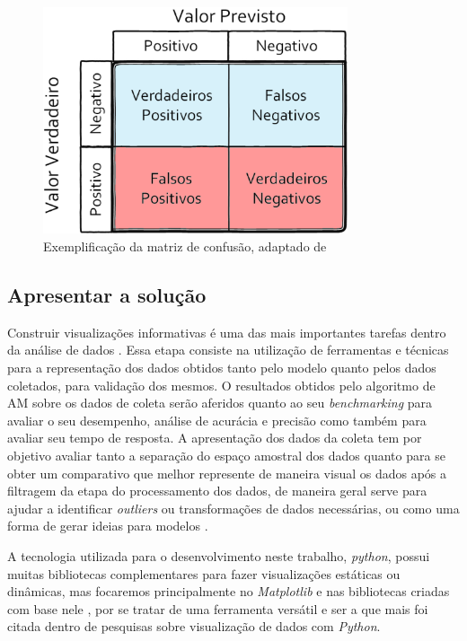 \begin{figure}[!htb]
	\centering
	\includegraphics[width=0.8\textwidth]{figuras/matriz_consusao.eps}
	\caption{Exemplificação da matriz de confusão, adaptado de }
	\label{matriz_consusao}
\end{figure}

\subsection{Apresentar a solução}
Construir visualizações informativas é uma das mais importantes tarefas dentro da análise de dados \cite{McKinney2012datapython}. Essa etapa consiste na utilização de ferramentas e técnicas para a representação dos dados obtidos tanto pelo modelo quanto pelos dados coletados, para validação dos mesmos. O resultados obtidos pelo algoritmo de AM sobre os dados de coleta serão aferidos quanto ao seu \textit{benchmarking} \cite{Benchmarking} para avaliar o seu desempenho, análise de acurácia e precisão como também para avaliar seu tempo de resposta. A apresentação dos dados da coleta tem por objetivo avaliar tanto a separação do espaço amostral dos dados quanto para se obter um comparativo que melhor represente de maneira visual os dados após a filtragem da etapa do processamento dos dados, de maneira geral serve para ajudar a identificar \textit{outliers} ou transformações de dados necessárias, ou como uma forma de gerar ideias para modelos \cite{McKinney2012datapython}.	
	
A tecnologia utilizada para o desenvolvimento neste trabalho, \textit{python}, possui muitas bibliotecas complementares para fazer visualizações estáticas ou dinâmicas, mas focaremos principalmente no \textit{Matplotlib} e nas bibliotecas criadas com base nele \cite{McKinney2012datapython}, por se tratar de uma ferramenta versátil e ser a que mais foi citada dentro de pesquisas sobre visualização de dados com \textit{Python}.

